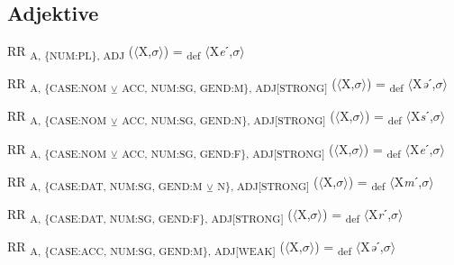{\subsection{Adjektive}


\begin{exe}
 RR \textsubscript{A, \{NUM:PL\}, ADJ} ($\langle$X,$\sigma $$\rangle$) = \textsubscript{def} $\langle$X\textit{e}ˊ,$\sigma $$\rangle$
\end{exe}

\begin{exe}
 RR \textsubscript{A, \{CASE:NOM} \textsubscript{${\veebar}$}\textsubscript{ ACC, NUM:SG, GEND:M\}, ADJ[STRONG]} ($\langle$X,$\sigma $$\rangle$) = \textsubscript{def} $\langle$X\textit{ə}ˊ,$\sigma $$\rangle$
\end{exe}

\begin{exe}
 RR \textsubscript{A, \{CASE:NOM} \textsubscript{${\veebar}$}\textsubscript{ ACC, NUM:SG, GEND:N\}, ADJ[STRONG]} ($\langle$X,$\sigma $$\rangle$) = \textsubscript{def} $\langle$X\textit{s}ˊ,$\sigma $$\rangle$
\end{exe}

\begin{exe}
 RR \textsubscript{A, \{CASE:NOM} \textsubscript{${\veebar}$}\textsubscript{ ACC, NUM:SG, GEND:F\}, ADJ[STRONG]} ($\langle$X,$\sigma $$\rangle$) = \textsubscript{def} $\langle$X\textit{e}ˊ,$\sigma $$\rangle$
\end{exe}

\begin{exe}
 RR \textsubscript{A, \{CASE:DAT, NUM:SG, GEND:M} \textsubscript{${\veebar}$}\textsubscript{ N\}, ADJ[STRONG]} ($\langle$X,$\sigma $$\rangle$) = \textsubscript{def} $\langle$X\textit{m}ˊ,$\sigma $$\rangle$
\end{exe}

\begin{exe}
 RR \textsubscript{A, \{CASE:DAT, NUM:SG, GEND:F\}, ADJ[STRONG]} ($\langle$X,$\sigma $$\rangle$) = \textsubscript{def} $\langle$X\textit{r}ˊ,$\sigma $$\rangle$
\end{exe}

\begin{exe}
 RR \textsubscript{A, \{CASE:ACC, NUM:SG, GEND:M\}, ADJ[WEAK]} ($\langle$X,$\sigma $$\rangle$) = \textsubscript{def} $\langle$X\textit{ə}ˊ,$\sigma $$\rangle$
\end{exe}

}
